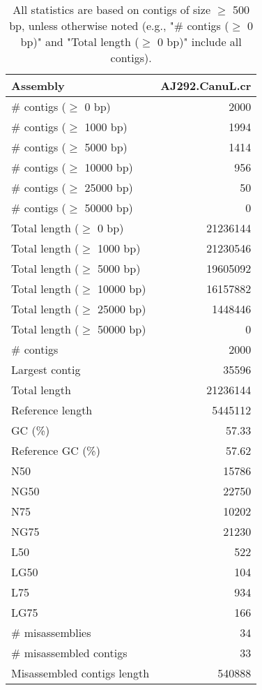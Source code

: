 \documentclass[12pt,a4paper]{article}
\begin{document}
\begin{table}[ht]
\begin{center}
\caption{All statistics are based on contigs of size $\geq$ 500 bp, unless otherwise noted (e.g., "\# contigs ($\geq$ 0 bp)" and "Total length ($\geq$ 0 bp)" include all contigs).}
\begin{tabular}{|l*{1}{|r}|}
\hline
Assembly & AJ292.CanuL.cr \\ \hline
\# contigs ($\geq$ 0 bp) & 2000 \\ \hline
\# contigs ($\geq$ 1000 bp) & 1994 \\ \hline
\# contigs ($\geq$ 5000 bp) & 1414 \\ \hline
\# contigs ($\geq$ 10000 bp) & 956 \\ \hline
\# contigs ($\geq$ 25000 bp) & 50 \\ \hline
\# contigs ($\geq$ 50000 bp) & 0 \\ \hline
Total length ($\geq$ 0 bp) & 21236144 \\ \hline
Total length ($\geq$ 1000 bp) & 21230546 \\ \hline
Total length ($\geq$ 5000 bp) & 19605092 \\ \hline
Total length ($\geq$ 10000 bp) & 16157882 \\ \hline
Total length ($\geq$ 25000 bp) & 1448446 \\ \hline
Total length ($\geq$ 50000 bp) & 0 \\ \hline
\# contigs & 2000 \\ \hline
Largest contig & 35596 \\ \hline
Total length & 21236144 \\ \hline
Reference length & 5445112 \\ \hline
GC (\%) & 57.33 \\ \hline
Reference GC (\%) & 57.62 \\ \hline
N50 & 15786 \\ \hline
NG50 & 22750 \\ \hline
N75 & 10202 \\ \hline
NG75 & 21230 \\ \hline
L50 & 522 \\ \hline
LG50 & 104 \\ \hline
L75 & 934 \\ \hline
LG75 & 166 \\ \hline
\# misassemblies & 34 \\ \hline
\# misassembled contigs & 33 \\ \hline
Misassembled contigs length & 540888 \\ \hline

\end{tabular}
\end{center}
\end{table}
\end{document}
